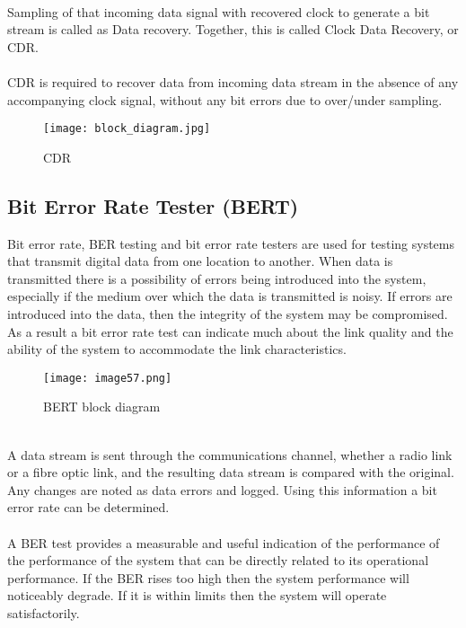 \documentclass[hidelinks, 12pt]{report}
\begin{document}
\\Sampling of that incoming data signal with recovered clock to generate a bit stream is called as Data recovery. Together, this is called Clock Data Recovery, or CDR.\\

\\CDR is required to recover data from incoming data stream in the absence of any accompanying clock signal, without any bit errors due to over/under sampling.
\begin{figure}[H]
\centering
\texttt{[image: block\_diagram.jpg]}
\caption[CDR  ]{CDR }
\label{CDR  }
\end{figure}
\subsection{Bit Error Rate Tester (BERT)}
\justify
Bit error rate, BER testing and bit error rate testers are used for testing systems that transmit digital data from one location to another. When data is transmitted there is a possibility of errors being introduced into the system, especially if the medium over which the data is transmitted is noisy. If errors are introduced into the data, then the integrity of the system may be compromised. As a result a bit error rate test can indicate much about the link quality and the ability of the system to accommodate the link characteristics.\\
\begin{figure}[H]
\centering
\texttt{[image: image57.png]}
\caption[BERT block diagram  ]{BERT block diagram }
\label{BERT block diagram  }
\end{figure}
\\A data stream is sent through the communications channel, whether a radio link or a fibre optic link, and the resulting data stream is compared with the original. Any changes are noted as data errors and logged. Using this information a bit error rate can be determined.\\
\\A BER test provides a measurable and useful indication of the performance of the performance of the system that can be directly related to its operational performance. If the BER rises too high then the system performance will noticeably degrade. If it is within limits then the system will operate satisfactorily.
\end{document}
